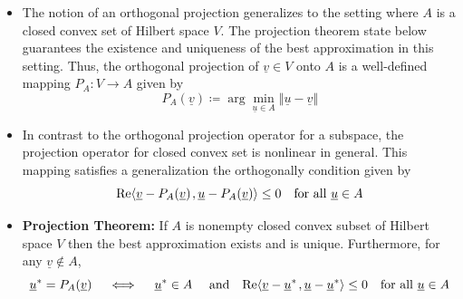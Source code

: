 \documentclass[11pt,twoside]{report}
\newcommand{\vecnot}{\underline}
\newcommand{\Real}{\mathrm{Re}}
\newcommand{\inner}[2]{{\left\langle #1 \mskip2mu , #2 \right\rangle}}
\begin{document}
\begin{itemize}
\item The notion of an orthogonal projection generalizes to the setting where $A$ is a closed convex set of Hilbert space $V$. The projection theorem state below guarantees the existence and uniqueness of the best approximation in this setting. Thus, the 
 orthogonal projection of $\vecnot{v}\in V$ onto $A$ is a well-defined mapping $P_{A}:V\rightarrow A$ given by 
 \[
P_A (\vecnot{v}) \coloneqq \arg \min_{\vecnot u\in A}\left\Vert \vecnot u-\vecnot v\right\Vert 
\]

\item  In contrast to the orthogonal projection operator for a subspace, the projection operator for closed convex set is nonlinear in general. This mapping satisfies a generalization  the orthogonally condition given by
\[
\Real{\inner{\vecnot{v} - P_A (\vecnot{v}) }{ \vecnot{u}  - P_A (\vecnot{v}) }}   \le 0 \quad \text{for all $ \vecnot{u} \in A$}
\]

\begin{center}

\end{center} 

\item \textbf{Projection Theorem:} If $A$ is nonempty closed convex subset of Hilbert space $V$ then the best approximation exists and is unique. 
Furthermore,  for any $\vecnot{v} \notin A$, 
\[
\vecnot{u}^* = P_A (\vecnot{v}) \quad \iff \quad  \vecnot{u}^* \in A \quad \text{ and} \quad  \Real{\inner{ \vecnot{v}-\vecnot{u}^* }{ \vecnot{u}-\vecnot{u}^* }} \le 0 \quad \text{for all $\vecnot{u}\in A$}\]



\end{itemize}
\end{document}
